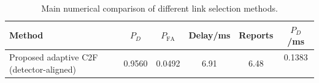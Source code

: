 \begin{table}[t]
    \centering
    \caption{Main numerical comparison of different link selection methods.}
    \label{tab:main_summary}
    \begin{tabular}{l c c c c c}
        \hline
        Method & $P_D$ & $P_{\mathrm{FA}}$ & Delay/ms & Reports & $P_D$/ms \\
        \hline
        Proposed adaptive C2F (detector-aligned) & 0.9560 & 0.0492 & 6.91 & 6.48 & 0.1383 \
        \hline
    \end{tabular}
\end{table}
